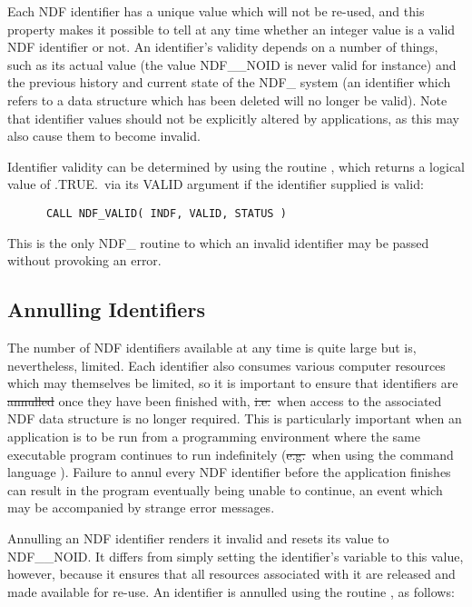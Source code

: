 Each NDF identifier has a unique value which will not be re-used, and this
property makes it possible to tell at any time whether an integer value is a
valid NDF identifier or not. 
An identifier's validity depends on a number of things, such as its actual
value (the value NDF\_\_NOID is never valid for instance) and the previous
history and current state of the NDF\_ system (an identifier which refers to
a data structure which has been deleted will no longer be valid). 
Note that identifier values should not be explicitly altered by
applications, as this may also cause them to become invalid. 

Identifier validity can be determined by using the routine , which
returns a logical value of .TRUE.\ via its VALID argument if the identifier
supplied is valid: 

\small
\begin{verbatim}
      CALL NDF_VALID( INDF, VALID, STATUS )
\end{verbatim}
\normalsize

This is the only NDF\_ routine to which an invalid identifier may be passed
without provoking an error.

\subsection{\label{ss:annul}Annulling Identifiers}

The number of NDF identifiers available at any time is quite large but is,
nevertheless, limited. 
Each identifier also consumes various computer resources which may
themselves be limited, so it is important to ensure that identifiers are
\st{annulled\/} once they have been finished with, \st{i.e.}\ when access
to the associated NDF data structure is no longer required. 
This is particularly important when an application is to be run from a
programming environment where the same executable program continues to
run indefinitely (\st{e.g.}\ when using the 
command language ).
Failure to annul every NDF identifier before the application finishes
can result in the program eventually being unable to continue, an
event which may be accompanied by strange error messages.

Annulling an NDF identifier renders it invalid and resets its value to
NDF\_\_NOID. 
It differs from simply setting the identifier's variable to this value, however,
because it ensures that all resources associated with it are released and made
available for re-use. 
An identifier is annulled using the routine , as follows:

